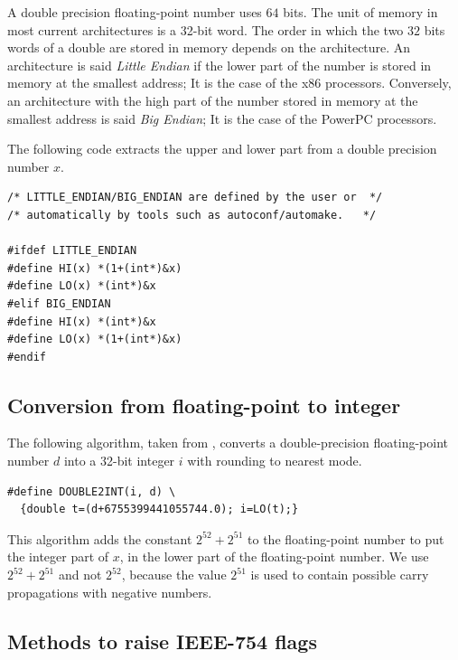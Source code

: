 A double precision floating-point number uses $64$ bits. The unit of memory in most current
architectures is a 32-bit word. The
order in which the two $32$ bits words of a double are stored in memory  depends on
the architecture. An architecture is said \emph{Little Endian} if the
lower part of the number is stored in memory at the smallest address;
It is the case of the x86 processors. Conversely, an architecture
with the high part of the number stored in memory at the smallest
address is said \emph{Big Endian}; It is the case of the PowerPC
processors.


The following code extracts the upper and lower part from a double
precision number $x$.

\begin{lstlisting}[label={chap0:lst:endian},
  caption={Extract upper and lower part of a double precision number $x$},firstnumber=1]
/* LITTLE_ENDIAN/BIG_ENDIAN are defined by the user or  */
/* automatically by tools such as autoconf/automake.   */

#ifdef LITTLE_ENDIAN
#define HI(x) *(1+(int*)&x)
#define LO(x) *(int*)&x
#elif BIG_ENDIAN
#define HI(x) *(int*)&x
#define LO(x) *(1+(int*)&x)
#endif
\end{lstlisting}



\subsection{Conversion from floating-point to integer}

\begin{theorem}
  The following algorithm, taken from \cite{AMDoptim2001}, converts a
  double-precision floating-point number $d$ into a 32-bit
  integer $i$ with rounding to nearest mode.
\begin{lstlisting}[label={chap0:lst:conversion2},caption={Conversion from FP to int},firstnumber=1]
#define DOUBLE2INT(i, d) \
  {double t=(d+6755399441055744.0); i=LO(t);}
\end{lstlisting}
\end{theorem}
This algorithm adds the constant $2^{52}+2^{51}$ to the floating-point
number to put the integer part of $x$, in the lower part of the
floating-point number.  We use $2^{52}+2^{51}$ and not $2^{52}$,
because the value $2^{51}$ is used to contain possible carry
propagations with negative numbers.



\subsection{Methods to raise IEEE-754 flags}

